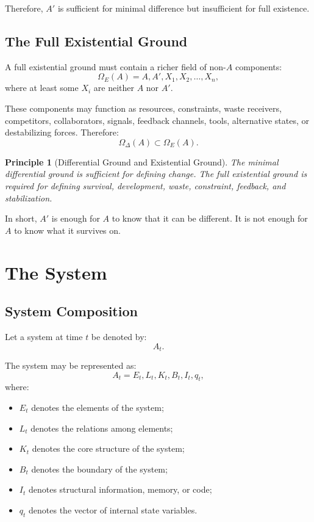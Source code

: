 \documentclass[11pt,a4paper]{article}
\newtheorem{principle}{Principle}
\begin{document}
Therefore, $A'$ is sufficient for minimal difference but insufficient for full existence.

\subsection{The Full Existential Ground}

A full existential ground must contain a richer field of non-$A$ components:
\[
\Omega_E(A)={A,A',X_1,X_2,\ldots,X_n},
\]
where at least some $X_i$ are neither $A$ nor $A'$.

These components may function as resources, constraints, waste receivers, competitors, collaborators, signals, feedback channels, tools, alternative states, or destabilizing forces. Therefore:
\[
\Omega_{\Delta}(A)\subset\Omega_E(A).
\]

\begin{principle}[Differential Ground and Existential Ground]
The minimal differential ground is sufficient for defining change. The full existential ground is required for defining survival, development, waste, constraint, feedback, and stabilization.
\end{principle}

In short, $A'$ is enough for $A$ to know that it can be different. It is not enough for $A$ to know what it survives on.

\section{The System}

\subsection{System Composition}

Let a system at time $t$ be denoted by:
\[
A_t.
\]

The system may be represented as:
\[
A_t={E_t,L_t,K_t,B_t,I_t,q_t},
\]
where:
\begin{itemize}[leftmargin=2em]
\item $E_t$ denotes the elements of the system;
\item $L_t$ denotes the relations among elements;
\item $K_t$ denotes the core structure of the system;
\item $B_t$ denotes the boundary of the system;
\item $I_t$ denotes structural information, memory, or code;
\item $q_t$ denotes the vector of internal state variables.
\end{itemize}
\end{document}
